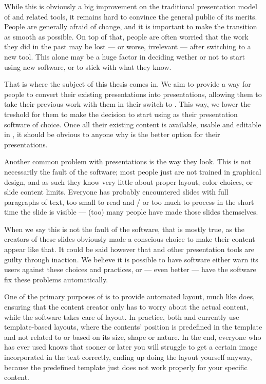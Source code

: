   While this is obviously a big improvement on the traditional presentation
  model of \ppt* and related tools, it remains hard to convince the general
  public of its merits. People are generally afraid of change, and it is
  important to make the transition as smooth as possible. On top of that,
  people are often worried that the work they did in the past may be lost ---
  or worse, irrelevant --- after switching to a new tool. This alone may be
  a huge factor in deciding wether or not to start using new software, or to
  stick with what they know.

  That is where the subject of this thesis comes in. We aim to provide a way
  for people to convert their existing \ppt presentations into \mxp
  presentations, allowing them to take their previous work with them in their
  switch to \mxp. This way, we lower the treshold for them to make the decision
  to start using \mxp as their presentation software of choice. Once all their
  existing \ppt content is available, usable and editable in \mxp, it should be
  obvious to anyone why \mxp is the better option for their presentations.

  Another common problem with \ppt presentations is the way they look. This is
  not necessarily the fault of the software; most people just are not trained
  in graphical design, and as such they know very little about proper layout,
  color choices, or slide content limits. Everyone has probably encountered
  slides with full paragraphs of text, too small to read and / or too much to
  process in the short time the slide is visible --- (too) many people have
  made those slides themselves.

  When we say this is not the fault of the software, that is mostly true, as
  the creators of these slides obviously made a conscious choice to make their
  content appear like that. It could be said however that \ppt* and other
  presentation tools are guilty through inaction. We believe it is possible to
  have software either warn its users against these choices and practices, or
  --- even better --- have the software fix these problems automatically.

  One of the primary purposes of \mxp is to provide automated layout, much like
  \latex does, ensuring that the content creator only has to worry about the
  actual content, while the software takes care of layout. In practice, both
  \latex and \mxp currently use template-based layouts, where the contents'
  position is predefined in the template and not related to or based on its
  size, shape or nature. In the end, everyone who has ever used \latex knows
  that sooner or later you will struggle to get a certain image incorporated in
  the text correctly, ending up doing the layout yourself anyway, because the
  predefined template just does not work properly for your specific content.

